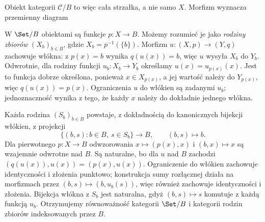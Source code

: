 Obiekt kategorii $\mathcal C/B$ to więc cała strzałka, a nie samo $X$. Morfizm wyznacza przemienny diagram
\begin{center}
\end{center}

\begin{przyklad}
W $\Set/B$ obiektami są funkcje $p:X\to B$. Możemy rozumieć je jako \emph{rodziny zbiorów} $(X_b)_{b\in B}$, gdzie $X_b=p^{-1}(\{b\})$. Morfizm $u:(X,p)\to(Y,q)$ zachowuje włókna: z $p(x)=b$ wynika $q(u(x))=b$, więc $u$ wysyła $X_b$ do $Y_b$. Odwrotnie, dla rodziny funkcji $u_b:X_b\to Y_b$ określamy $u(x)=u_{p(x)}(x)$. Jest to funkcja dobrze określona, ponieważ $x\in X_{p(x)}$, a jej wartość należy do $Y_{p(x)}$, więc $q(u(x))=p(x)$. Ograniczenia $u$ do włókien są zadanymi $u_b$; jednoznaczność wynika z tego, że każdy $x$ należy do dokładnie jednego włókna.

Każda rodzina $(S_b)_{b\in B}$ powstaje, z dokładnością do kanonicznych bijekcji włókien, z projekcji
\[
\{(b,s):b\in B,\ s\in S_b\}\longrightarrow B,\qquad (b,s)\longmapsto b.
\]
Dla pierwotnego $p:X\to B$ odwzorowania $x\mapsto(p(x),x)$ i $(b,x)\mapsto x$ są wzajemnie odwrotne nad $B$. Są naturalne, bo dla $u$ nad $B$ zachodzi $(q(u(x)),u(x))=(p(x),u(x))$. Ograniczenie do włókien zachowuje identyczności i złożenia punktowo; konstrukcja sumy rozłącznej działa na morfizmach przez $(b,s)\mapsto(b,u_b(s))$, więc również zachowuje identyczności i złożenia. Bijekcja włókna z $S_b$ jest naturalna, gdyż $(b,s)\mapsto s$ komutuje z każdą funkcją $u_b$. Otrzymujemy równoważność kategorii $\Set/B$ i kategorii rodzin zbiorów indeksowanych przez $B$.
\end{przyklad}

